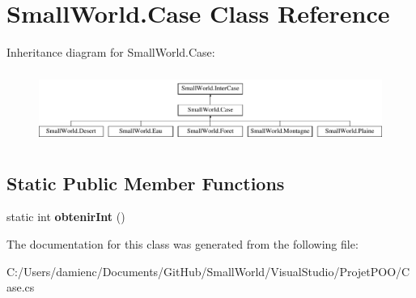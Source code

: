 \hypertarget{class_small_world_1_1_case}{\section{Small\-World.\-Case Class Reference}
\label{class_small_world_1_1_case}
}
Inheritance diagram for Small\-World.\-Case\-:\begin{figure}[H]
\begin{center}
\leavevmode
\includegraphics[height=2.349650cm]{class_small_world_1_1_case}
\end{center}
\end{figure}
\subsection*{Static Public Member Functions}
\begin{DoxyCompactItemize}
\item 
\hypertarget{class_small_world_1_1_case_a66da4f3fcc3e0c9d7fb64347564e1664}{static int {\bfseries obtenir\-Int} ()}\label{class_small_world_1_1_case_a66da4f3fcc3e0c9d7fb64347564e1664}

\end{DoxyCompactItemize}


The documentation for this class was generated from the following file\-:\begin{DoxyCompactItemize}
\item 
C\-:/\-Users/damienc/\-Documents/\-Git\-Hub/\-Small\-World/\-Visual\-Studio/\-Projet\-P\-O\-O/Case.\-cs\end{DoxyCompactItemize}
